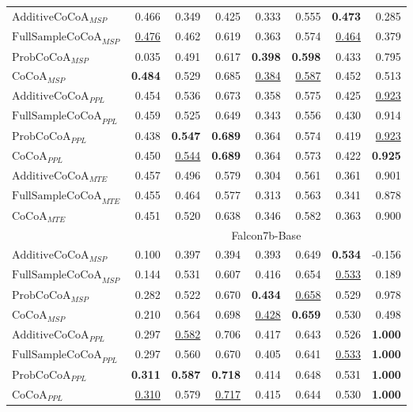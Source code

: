 \begin{table*}[h!]
\begin{tabular}{lrrrrrrr}
$\text{AdditiveCoCoA}_{MSP}$ & 0.466& 0.349& 0.425& 0.333& 0.555& \textbf{0.473}& 0.285\\
$\text{FullSampleCoCoA}_{MSP}$ & \underline{0.476}& 0.462& 0.619& 0.363& 0.574& \underline{0.464}& 0.379\\
$\text{ProbCoCoA}_{MSP}$ & 0.035& 0.491& 0.617& \textbf{0.398}& \textbf{0.598}& 0.433& 0.795\\
$\text{CoCoA}_{MSP}$ & \textbf{0.484}& 0.529& 0.685& \underline{0.384}& \underline{0.587}& 0.452& 0.513\\

\midrule

$\text{AdditiveCoCoA}_{PPL}$ & 0.454& 0.536& 0.673& 0.358& 0.575& 0.425& \underline{0.923}\\
$\text{FullSampleCoCoA}_{PPL}$ & 0.459& 0.525& 0.649& 0.343& 0.556& 0.430& 0.914\\
$\text{ProbCoCoA}_{PPL}$ & 0.438& \textbf{0.547}& \textbf{0.689}& 0.364& 0.574& 0.419& \underline{0.923}\\
$\text{CoCoA}_{PPL}$ & 0.450& \underline{0.544}& \textbf{0.689}& 0.364& 0.573& 0.422& \textbf{0.925}\\

\midrule

$\text{AdditiveCoCoA}_{MTE}$ & 0.457& 0.496& 0.579& 0.304& 0.561& 0.361& 0.901\\
$\text{FullSampleCoCoA}_{MTE}$ & 0.455& 0.464& 0.577& 0.313& 0.563& 0.341& 0.878\\
$\text{CoCoA}_{MTE}$ & 0.451& 0.520& 0.638& 0.346& 0.582& 0.363& 0.900\\
\midrule

\rowcolor[gray]{0.9} & \multicolumn{7}{c}{Falcon7b-Base} \\

\midrule

$\text{AdditiveCoCoA}_{MSP}$ & 0.100& 0.397& 0.394& 0.393& 0.649& \textbf{0.534}& -0.156\\
$\text{FullSampleCoCoA}_{MSP}$ & 0.144& 0.531& 0.607& 0.416& 0.654& \underline{0.533}& 0.189\\
$\text{ProbCoCoA}_{MSP}$ & 0.282& 0.522& 0.670& \textbf{0.434}& \underline{0.658}& 0.529& 0.978\\
$\text{CoCoA}_{MSP}$ & 0.210& 0.564& 0.698& \underline{0.428}& \textbf{0.659}& 0.530& 0.498\\

\midrule

$\text{AdditiveCoCoA}_{PPL}$ & 0.297& \underline{0.582}& 0.706& 0.417& 0.643& 0.526& \textbf{1.000}\\
$\text{FullSampleCoCoA}_{PPL}$ & 0.297& 0.560& 0.670& 0.405& 0.641& \underline{0.533}& \textbf{1.000}\\
$\text{ProbCoCoA}_{PPL}$ & \textbf{0.311}& \textbf{0.587}& \textbf{0.718}& 0.414& 0.648& 0.531& \textbf{1.000}\\
$\text{CoCoA}_{PPL}$ & \underline{0.310}& 0.579& \underline{0.717}& 0.415& 0.644& 0.530& \textbf{1.000}\\


\end{tabular}
\end{table*}
